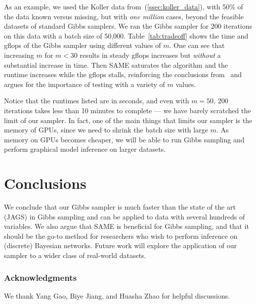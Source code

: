 \documentclass{article} %
\begin{document}
As an example, we used the Koller data from~(\ref{ssec:koller_data}), with 50\% of the data known
versus missing, but with \emph{one million} cases, beyond the feasible datasets of standard Gibbs
samplers. We ran the Gibbs sampler for 200 iterations on this data with a batch size of 50,000.
Table~\ref{tab:tradeoff} shows the time and gflops of the Gibbs sampler using different values of
$m$.  One can see that increasing $m$ for $m < 30$ results in steady gflops increases but
\emph{without} a substantial increase in time. Then SAME saturates the algorithm and the runtime
increases while the gflops stalls, reinforcing the conclusions from~\citep{SAME2015} and argues for
the importance of testing with a variety of $m$ values.

Notice that the runtimes listed are in seconds, and even with $m=50$, 200 iterations takes less than
10 minutes to complete --- we have barely scratched the limit of our sampler. In fact, one of the
main things that limits our sampler is the memory of GPUs, since we need to shrink the batch size
with large $m$. As memory on GPUs becomes cheaper, we will be able to run Gibbs sampling and perform
graphical model inference on larger datasets.


\section{Conclusions}\label{sec:conclusions}

We conclude that our Gibbs sampler is much faster than the state of the art (JAGS) in Gibbs sampling
and can be applied to data with several hundreds of variables. We also argue that SAME is beneficial
for Gibbs sampling, and that it should be the go-to method for researchers who wish to perform
inference on (discrete) Bayesian networks. Future work will explore the application of our sampler
to a wider class of real-world datasets.


\subsubsection*{Acknowledgments}

We thank Yang Gao, Biye Jiang, and Huasha Zhao for helpful discussions.



\end{document}

